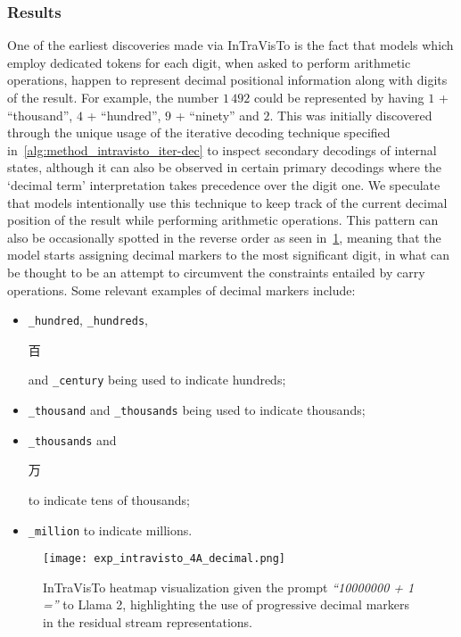 \subsubsection{Results}

One of the earliest discoveries made via InTraVisTo is the fact that models which employ dedicated tokens for each digit, when asked to perform arithmetic operations, happen to represent decimal positional information along with digits of the result.
For example, the number $1\,492$ could be represented by having $1$ + ``thousand'', $4$ + ``hundred'', $9$ + ``ninety'' and $2$.
This was initially discovered through the unique usage of the iterative decoding technique specified in~\cref{alg:method_intravisto_iter-dec} to inspect secondary decodings of internal states, although it can also be observed in certain primary decodings where the `decimal term' interpretation takes precedence over the digit one.
We speculate that models intentionally use this technique to keep track of the current decimal position of the result while performing arithmetic operations.
This pattern can also be occasionally spotted in the reverse order as seen in~\cref{fig:exp_intravisto_4_A}, meaning that the model starts assigning decimal markers to the most significant digit, in what can be thought to be an attempt to circumvent the constraints entailed by carry operations.
Some relevant examples of decimal markers include:
\begin{itemize}
    \item \texttt{\_hundred}, \texttt{\_hundreds}, \begin{CJK}{UTF8}{goth}百\end{CJK} and \texttt{\_century} being used to indicate hundreds;
    \item \texttt{\_thousand} and \texttt{\_thousands} being used to indicate thousands;
    \item \texttt{\_thousands} and \begin{CJK}{UTF8}{goth}万\end{CJK} to indicate tens of thousands;
    \item \texttt{\_million} to indicate millions.
\end{itemize}

\begin{figure}[t!]
    \centering
    \texttt{[image: exp\_intravisto\_4A\_decimal.png]}
    \caption[InTraVisTo heatmap visualization given the prompt \emph{``10000000 + 1 =''} to Llama 2.]{InTraVisTo heatmap visualization given the prompt \emph{``10000000 + 1 =''} to Llama 2, highlighting the use of progressive decimal markers in the residual stream representations.}
    \label{fig:exp_intravisto_4_A}
\end{figure}

